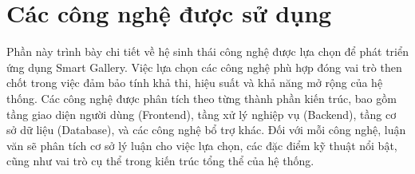\section{Các công nghệ được sử dụng}

Phần này trình bày chi tiết về hệ sinh thái công nghệ được lựa chọn để phát triển ứng dụng Smart Gallery. Việc lựa chọn các công nghệ phù hợp đóng vai trò then chốt trong việc đảm bảo tính khả thi, hiệu suất và khả năng mở rộng của hệ thống. Các công nghệ được phân tích theo từng thành phần kiến trúc, bao gồm tầng giao diện người dùng (Frontend), tầng xử lý nghiệp vụ (Backend), tầng cơ sở dữ liệu (Database), và các công nghệ bổ trợ khác. Đối với mỗi công nghệ, luận văn sẽ phân tích cơ sở lý luận cho việc lựa chọn, các đặc điểm kỹ thuật nổi bật, cũng như vai trò cụ thể trong kiến trúc tổng thể của hệ thống.




